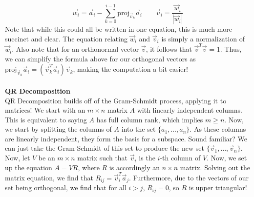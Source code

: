 \documentclass[12pt]{amsart}
\begin{document}
\[\vec{w}_i = \vec{a}_i - \sum_{k = 0}^{i - 1}\mathrm{proj}_{\vec{v}_k}\vec{a}_i \quad \quad \vec{v}_i = \frac{\vec{w}_i}{|\vec{w}_i|}\]
Note that while this could all be written in one equation, this is much more succinct and clear. The equation relating $\vec{w}_i$ and $\vec{v}_i$ is simply a normalization of $\vec{w}_i$. Also note that for an orthonormal vector $\vec{v}$, it follows that $\vec{v}^T\vec{v}$ = 1. Thus, we can simplify the formula above for our orthogonal vectors as $\mathrm{proj}_{\vec{v}_k}\vec{a}_i = (\vec{v}_k^T\vec{a}_i)\vec{v}_k$, making the computation a bit easier!
\\ \\
\textbf{QR Decomposition}\\
QR Decomposition builds off of the Gram-Schmidt process, applying it to matrices! We start with an $m \times n$ matrix $A$ with linearly independent columns. This is equivalent to saying $A$ has full column rank, which implies $m \geq n$. Now, we start by splitting the columns of $A$ into the set $\{a_1, \dots, a_n\}$. As these columns are linearly independent, they form the basis for a subspace. Sound familiar? We can just take the Gram-Schmidt of this set to produce the new set $\{\vec{v}_1,\dots, \vec{v}_n\}$. Now, let $V$ be an $m \times n$ matrix such that $\vec{v}_i$ is the $i$-th column of $V$. Now, we set up the equation $A = VR$, where $R$ is accordingly an $n \times n$ matrix. Solving out the matrix equation, we find that $R_{ij} = \vec{v}_i^T\vec{a}_j$. Furthermore, due to the vectors of our set being orthogonal, we find that for all $i > j$, $R_{ij} = 0$, so $R$ is upper triangular!
\end{document}
